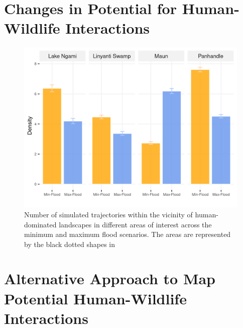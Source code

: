 \documentclass[../FinalThesis.tex]{subfiles}
\begin{document}
\section{Changes in Potential for Human-Wildlife Interactions}
\begin{figure}[!ht]
  \begin{center}
  \includegraphics[width = \textwidth]{Figures/HWCDifferenceAOI.png}
  \caption{Number of simulated trajectories within the vicinity of
  human-dominated landscapes in different areas of interest across the minimum
  and maximum flood scenarios. The areas are represented by the black dotted
  shapes in }
  \label{HWCDifference}
  \end{center}
\end{figure}

\newpage
\section{Alternative Approach to Map Potential Human-Wildlife Interactions}
\label{AlternativeHWC}
\end{document}
